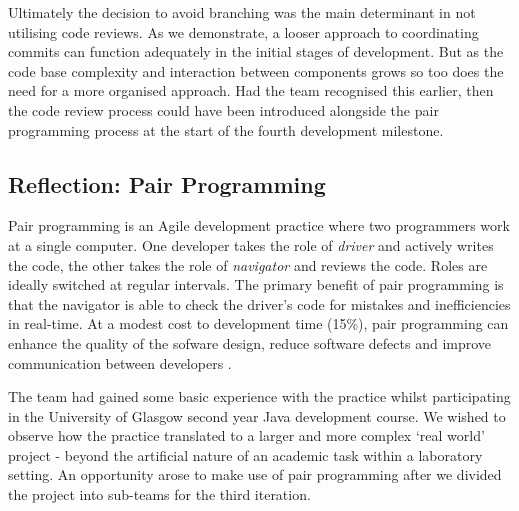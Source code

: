 \documentclass{l3proj}
\begin{document}
Ultimately the decision to avoid branching was the main determinant in not utilising code reviews. As we demonstrate, a looser approach to coordinating commits can function adequately in the initial stages of development. But as the code base complexity and interaction between components grows so too does the need for a more organised approach. Had the team recognised this earlier, then the code review process could have been introduced alongside the pair programming process at the start of the fourth development milestone.   

\subsection{Reflection: Pair Programming}
\label{sec:pairprogramming}





Pair programming is an Agile development practice where two programmers work at a single computer. One developer takes the role of \textit{driver} and actively writes the code, the other takes the role of \textit{navigator} and reviews the code. Roles are ideally switched at regular intervals. The primary benefit of pair programming is that the navigator is able to check the driver’s code for mistakes and inefficiencies in real-time. At a modest cost to development time (15\%), pair programming can enhance the quality of the sofware design, reduce software defects and improve communication between developers \cite{PairProgramming}.

The team had gained some basic experience with the practice whilst participating in the University of Glasgow second year Java development course. We wished to observe how the practice translated to a larger and more complex `real world’ project - beyond the artificial nature of an academic task within a laboratory setting. An opportunity arose to make use of pair programming after we divided the project into sub-teams for the third iteration.
\end{document}
